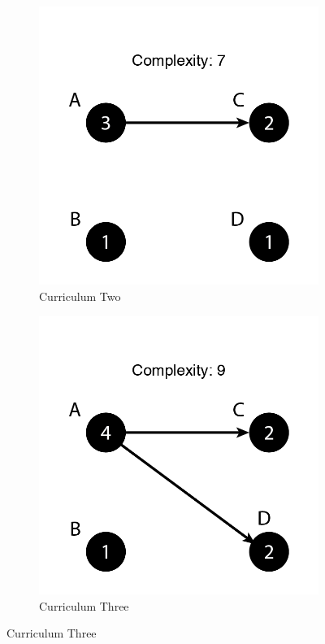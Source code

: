 \documentclass[botnum, fleqn]{unmeethesis}
\begin{document}
\begin{figure}
\begin{subfigure}[h!]{.3\linewidth}
        \includegraphics[width=\linewidth]{./figures/Simple7.png}
        \caption{Curriculum Two}\label{fig:simple7}
      \end{subfigure}
      \begin{subfigure}[h!]{.3\linewidth}
        \includegraphics[width=\linewidth]{./figures/Simple9-1.png}
        \caption{Curriculum Three}\label{fig:simple91}
      \end{subfigure}


\end{figure}
\end{document}

